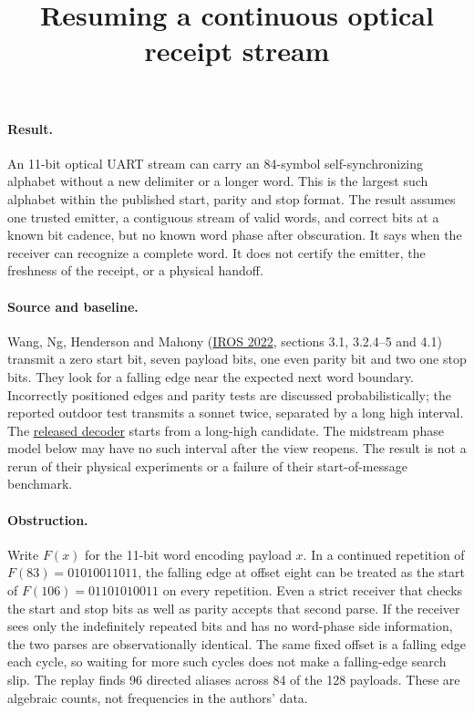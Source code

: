 \documentclass{article}
\begin{document}
\title{Resuming a continuous optical receipt stream}
\maketitle

\paragraph{Result.}
An 11-bit optical UART stream can carry an 84-symbol self-synchronizing
alphabet without a new delimiter or a longer word. This is the largest such
alphabet within the published start, parity and stop format. The result assumes
one trusted emitter, a contiguous stream of valid words, and correct bits at a
known bit cadence, but no known word phase after obscuration. It says when the
receiver can recognize a complete word. It does not certify the emitter, the
freshness of the receipt, or a physical handoff.

\paragraph{Source and baseline.}
Wang, Ng, Henderson and Mahony
(\href{https://arxiv.org/abs/2208.01710}{IROS 2022}, sections 3.1,
3.2.4--5 and 4.1) transmit a zero start bit, seven payload bits,
one even parity bit and two one stop bits. They look for a falling edge near
the expected next word boundary. Incorrectly positioned edges and parity tests
are discussed probabilistically; the reported outdoor test transmits a sonnet
twice, separated by a long high interval. The
\href{https://github.com/ziweiWWANG/Event-Beacon-Communication/blob/00be0f34eea83d2a3508706a4d0a922c4047062e/decoder.m}{released decoder}
starts from a long-high candidate. The midstream phase model below may have
no such interval after the view reopens. The result is not a rerun of their
physical experiments or a failure of their start-of-message benchmark.

\paragraph{Obstruction.}
Write \(F(x)\) for the 11-bit word encoding payload \(x\). In a continued
repetition of \(F(83)=01010011011\), the falling edge at offset eight can
be treated as the start of \(F(106)=01101010011\) on every repetition. Even a
strict receiver that checks the start and stop bits as well as parity accepts that second
parse. If the receiver sees only the indefinitely repeated bits and has no
word-phase side information, the two parses are observationally identical.
The same fixed offset is a falling edge each cycle, so waiting for more
such cycles does not make a falling-edge search slip. The replay finds 96
directed aliases across 84 of the 128 payloads. These are algebraic counts,
not frequencies in the authors' data.
\end{document}

